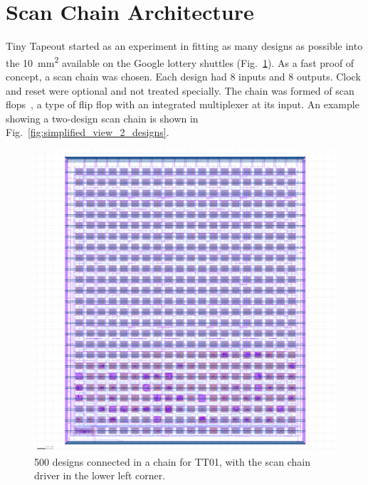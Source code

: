 \section{Scan Chain Architecture}
\label{sec:scanchain_arch}

Tiny Tapeout started as an experiment in fitting as many designs as possible into the \qty{10}{\milli\meter\squared} available on the Google lottery shuttles (Fig.~\ref{fig:500_designs_chain_TT01}).
As a fast proof of concept, a scan chain was chosen.
Each design had 8 inputs and 8 outputs.
Clock and reset were optional and not treated specially. The chain was formed of scan flops~\cite{skywaterpdk}, a type of flip flop with an integrated multiplexer at its input. An example showing a two-design scan chain is shown in Fig.~\ref{fig:simplified_view_2_designs}.

\begin{figure}[!t]
\centering
\includegraphics[width=1\columnwidth]{./Figs/tt01_whole_die.png}
\caption{500 designs connected in a chain for TT01, with the scan chain driver in the lower left corner.}
\label{fig:500_designs_chain_TT01}
\end{figure}

